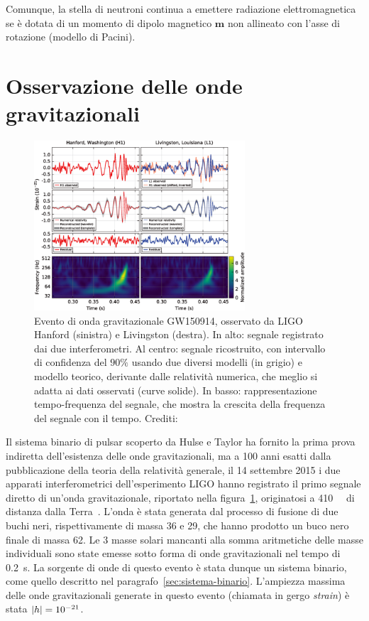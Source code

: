 Comunque, la stella di neutroni continua a emettere radiazione elettromagnetica
se è dotata di un momento di dipolo magnetico $\bm{m}$ non allineato con l'asse
di rotazione (modello di Pacini).

\section{Osservazione delle onde gravitazionali}
\label{sec:osservazione-onde}

\begin{figure}
  \centering
  \includegraphics[width=0.7\textwidth]{figure/ligo-grav-wave-signal}
  \caption{Evento di onda gravitazionale GW150914, osservato da LIGO Hanford
    (sinistra) e Livingston (destra).  In alto: segnale registrato dai due
    interferometri.  Al centro: segnale ricostruito, con intervallo di
    confidenza del \(90\%\) usando due diversi modelli (in grigio) e modello
    teorico, derivante dalle relatività numerica, che meglio si adatta ai dati
    osservati (curve solide).  In basso: rappresentazione tempo-frequenza del
    segnale, che mostra la crescita della frequenza del segnale con il tempo.
    Crediti:~\textcite{2016PhRvL.116f1102A}}
  \label{fig:ligo-grav-wave}
\end{figure}
Il sistema binario di pulsar scoperto da Hulse e Taylor ha fornito la prima
prova indiretta dell'esistenza delle onde gravitazionali, ma a 100 anni esatti
dalla pubblicazione della teoria della relatività generale, il 14 settembre 2015
i due apparati interferometrici dell'esperimento LIGO hanno registrato il primo
segnale diretto di un'onda gravitazionale, riportato nella
figura~\ref{fig:ligo-grav-wave}, originatosi a \SI{410}{\mega\parsec} di
distanza dalla Terra~\parencite{2016PhRvL.116f1102A}.  L'onda è stata generata
dal processo di fusione di due buchi neri, rispettivamente di massa
\SI{36}{\solarmass} e \SI{29}{\solarmass}, che hanno prodotto un buco nero
finale di massa \SI{62}{\solarmass}.  Le \(3\) masse solari mancanti alla somma
aritmetiche delle masse individuali sono state emesse sotto forma di onde
gravitazionali nel tempo di \SI{0.2}{\second}.  La sorgente di onde di questo
evento è stata dunque un sistema binario, come quello descritto nel
paragrafo~\ref{sec:sistema-binario}.  L'ampiezza massima delle onde
gravitazionali generate in questo evento (chiamata in gergo \emph{strain}) è
stata \(\lvert h\rvert = 10^{-21}\).

